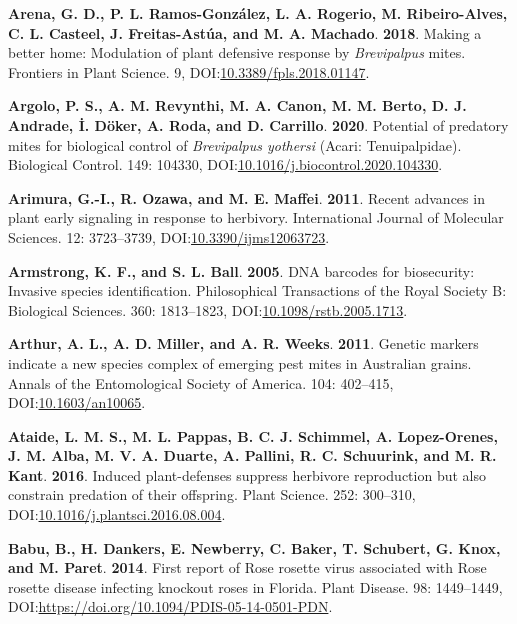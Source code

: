 \documentclass[12pt,final,CPage]{ufthesis}
\newlength{\cslhangindent}
\newenvironment{CSLReferences}[2] %
{%
	\setlength{\parindent}{0pt}
	\ifodd #1 \everypar{\setlength{\hangindent}{\cslhangindent}}\ignorespaces\fi
	\ifnum #2 > 0
	\setlength{\parskip}{#2\baselineskip}
	\fi
}%
{}
\begin{document}
{\begin{CSLReferences}{1}{0}
  \leavevmode{}%
  \textbf{Arena, G. D., P. L. Ramos-González, L. A. Rogerio, M. Ribeiro-Alves, C. L. Casteel, J. Freitas-Astúa, and M. A. Machado}. \textbf{2018}. Making a better home: Modulation of plant defensive response by {\emph{Brevipalpus}} mites. Frontiers in Plant Science. 9, DOI:\href{https://doi.org/10.3389/fpls.2018.01147}{10.3389/fpls.2018.01147}.

  \leavevmode{}%
  \textbf{Argolo, P. S., A. M. Revynthi, M. A. Canon, M. M. Berto, D. J. Andrade, İ. Döker, A. Roda, and D. Carrillo}. \textbf{2020}. Potential of predatory mites for biological control of {\emph{Brevipalpus yothersi}} ({Acari}: {Tenuipalpidae}). Biological Control. 149: 104330, DOI:\href{https://doi.org/10.1016/j.biocontrol.2020.104330}{10.1016/j.biocontrol.2020.104330}.

  \leavevmode{}%
  \textbf{Arimura, G.-I., R. Ozawa, and M. E. Maffei}. \textbf{2011}. Recent advances in plant early signaling in response to herbivory. International Journal of Molecular Sciences. 12: 3723--3739, DOI:\href{https://doi.org/10.3390/ijms12063723}{10.3390/ijms12063723}.

  \leavevmode{}%
  \textbf{Armstrong, K. F., and S. L. Ball}. \textbf{2005}. {DNA} barcodes for biosecurity: Invasive species identification. Philosophical Transactions of the Royal Society B: Biological Sciences. 360: 1813--1823, DOI:\href{https://doi.org/10.1098/rstb.2005.1713}{10.1098/rstb.2005.1713}.

  \leavevmode{}%
  \textbf{Arthur, A. L., A. D. Miller, and A. R. Weeks}. \textbf{2011}. Genetic markers indicate a new species complex of emerging pest mites in {Australian} grains. Annals of the Entomological Society of America. 104: 402--415, DOI:\href{https://doi.org/10.1603/an10065}{10.1603/an10065}.

  \leavevmode{}%
  \textbf{Ataide, L. M. S., M. L. Pappas, B. C. J. Schimmel, A. Lopez-Orenes, J. M. Alba, M. V. A. Duarte, A. Pallini, R. C. Schuurink, and M. R. Kant}. \textbf{2016}. Induced plant-defenses suppress herbivore reproduction but also constrain predation of their offspring. Plant Science. 252: 300--310, DOI:\href{https://doi.org/10.1016/j.plantsci.2016.08.004}{10.1016/j.plantsci.2016.08.004}.

  \leavevmode{}%
  \textbf{Babu, B., H. Dankers, E. Newberry, C. Baker, T. Schubert, G. Knox, and M. Paret}. \textbf{2014}. First report of {Rose rosette virus} associated with {Rose rosette disease} infecting knockout roses in {Florida}. Plant Disease. 98: 1449--1449, DOI:\url{https://doi.org/10.1094/PDIS-05-14-0501-PDN}.


\end{CSLReferences}}
\end{document}

